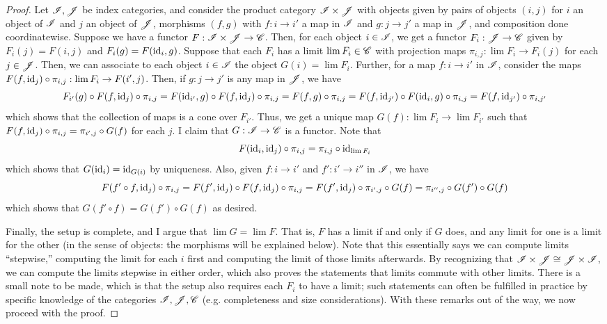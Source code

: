 \documentclass[12pt]{exam}
\begin{document}
\begin{proof}
	Let $\mathscr{I},\mathscr{J}$ be index categories, and consider the product category $\mathscr{I} \times \mathscr{J}$ with objects given by pairs of objects $(i,j)$ for $i$ an object of $\mathscr{I}$ and $j$ an object of $\mathscr{J}$, morphisms $(f,g)$ with $f : i \to i'$ a map in $\mathscr{I}$ and $g : j \to j'$ a map in $\mathscr{J}$, and composition done coordinatewise. Suppose we have a functor $F : \mathscr{I} \times \mathscr{J} \to \mathscr{C}$. Then, for each object $i \in \mathscr{I}$, we get a functor $F_i : \mathscr{J} \to \mathscr{C}$ given by $F_i(j) = F(i,j)$ and $F_i(g) = F(\operatorname{id}_i,g)$. Suppose that each $F_i$ has a limit $\lim F_i \in \mathscr{C}$ with projection maps $\pi_{i,j} : \lim F_i \to F_i(j)$ for each $j \in \mathscr{J}$. Then, we can associate to each object $i \in \mathscr{I}$ the object $G(i) = \lim F_i$. Further, for a map $f : i \to i'$ in $\mathscr{I}$, consider the maps $F(f,\operatorname{id}_j) \circ \pi_{i,j} : \lim F_i \to F(i',j)$. Then, if $g : j \to j'$ is any map in $\mathscr{J}$, we have
	\[ F_{i'}(g) \circ F(f,\operatorname{id}_j) \circ \pi_{i,j} = F(\operatorname{id}_{i'},g) \circ F(f,\operatorname{id}_j) \circ \pi_{i,j} = F(f,g) \circ \pi_{i,j} = F(f,\operatorname{id}_{j'}) \circ F(\operatorname{id}_i,g) \circ \pi_{i,j} = F(f,\operatorname{id}_{j'}) \circ \pi_{i,j'} \]
	which shows that the collection of maps is a cone over $F_{i'}$. Thus, we get a unique map $G(f) : \lim F_i \to \lim F_{i'}$ such that $F(f,\operatorname{id}_j) \circ \pi_{i,j} = \pi_{i',j} \circ G(f)$ for each $j$. I claim that $G : \mathscr{I} \to \mathscr{C}$ is a functor. Note that
	\[ F(\operatorname{id}_i,\operatorname{id}_j) \circ \pi_{i,j} = \pi_{i,j} \circ \operatorname{id}_{\lim F_i} \]
	which shows that $G(\operatorname{id}_i) = \operatorname{id}_{G(i)}$ by uniqueness. Also, given $f : i \to i'$ and $f' : i' \to i''$ in $\mathscr{I}$, we have
	\[ F(f' \circ f,\operatorname{id}_j) \circ \pi_{i,j} = F(f',\operatorname{id}_j) \circ F(f,\operatorname{id}_j) \circ \pi_{i,j} = F(f',\operatorname{id}_j) \circ \pi_{i',j} \circ G(f) = \pi_{i'',j} \circ G(f') \circ G(f) \]
	which shows that $G(f' \circ f) = G(f') \circ G(f)$ as desired.
	
	Finally, the setup is complete, and I argue that $\lim G = \lim F$. That is, $F$ has a limit if and only if $G$ does, and any limit for one is a limit for the other (in the sense of objects: the morphisms will be explained below). Note that this essentially says we can compute limits ``stepwise,'' computing the limit for each $i$ first and computing the limit of those limits afterwards. By recognizing that $\mathscr{I} \times \mathscr{J} \cong \mathscr{J} \times \mathscr{I}$, we can compute the limits stepwise in either order, which also proves the statements that limits commute with other limits. There is a small note to be made, which is that the setup also requires each $F_i$ to have a limit; such statements can often be fulfilled in practice by specific knowledge of the categories $\mathscr{I},\mathscr{J},\mathscr{C}$ (e.g. completeness and size considerations). With these remarks out of the way, we now proceed with the proof.
	

\end{proof}
\end{document}
